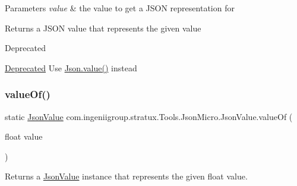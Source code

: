 \begin{DoxyParams}{Parameters}
{\em value} & the value to get a J\+S\+ON representation for \\
\hline
\end{DoxyParams}
\begin{DoxyReturn}{Returns}
a J\+S\+ON value that represents the given value 
\end{DoxyReturn}
\begin{DoxyRefDesc}{Deprecated}
\item[\hyperlink{deprecated__deprecated000011}{Deprecated}]Use {\ttfamily \hyperlink{classcom_1_1ingeniigroup_1_1stratux_1_1_tools_1_1_json_micro_1_1_json_aa7a17dbf2bbb667284cb5a86d404bf6d}{Json.\+value()}} instead \end{DoxyRefDesc}
\mbox{\label{classcom_1_1ingeniigroup_1_1stratux_1_1_tools_1_1_json_micro_1_1_json_value_af01c90aab8bd93c32f12af46501a5727}} 
\subsubsection{\texorpdfstring{value\+Of()}{valueOf()}\hspace{0.1cm}{\footnotesize\ttfamily [3/6]}}
{\footnotesize\ttfamily static \hyperlink{classcom_1_1ingeniigroup_1_1stratux_1_1_tools_1_1_json_micro_1_1_json_value}{Json\+Value} com.\+ingeniigroup.\+stratux.\+Tools.\+Json\+Micro.\+Json\+Value.\+value\+Of (\begin{DoxyParamCaption}\item[{float}]{value }\end{DoxyParamCaption})\hspace{0.3cm}{\ttfamily [static]}}

Returns a \hyperlink{classcom_1_1ingeniigroup_1_1stratux_1_1_tools_1_1_json_micro_1_1_json_value}{Json\+Value} instance that represents the given {\ttfamily float} value.


